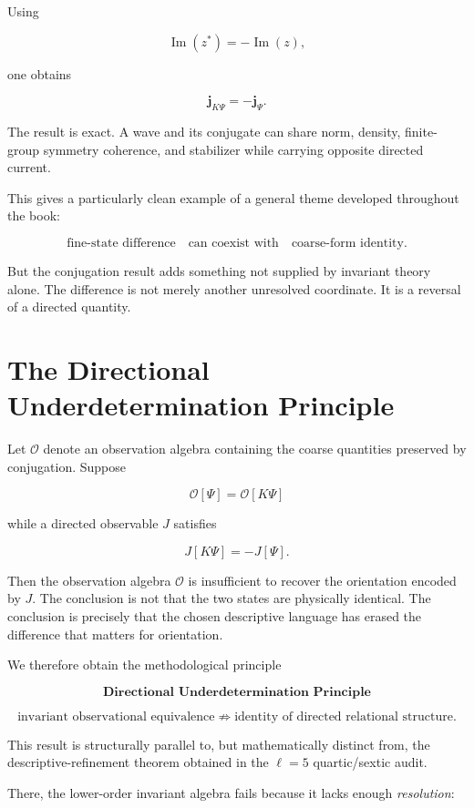 Using

\[
\operatorname{Im}(z^*)=-\operatorname{Im}(z),
\]

one obtains

\[
\boxed{
\mathbf j_{K\Psi}=-\mathbf j_{\Psi}.
}
\]

The result is exact. A wave and its conjugate can share norm, density, finite-group symmetry coherence, and stabilizer while carrying opposite directed current.

This gives a particularly clean example of a general theme developed throughout the book:

\[
\text{fine-state difference}
\quad\text{can coexist with}\quad
\text{coarse-form identity}.
\]

But the conjugation result adds something not supplied by invariant theory alone. The difference is not merely another unresolved coordinate. It is a reversal of a directed quantity.

\section{The Directional Underdetermination Principle}

Let $\mathcal O$ denote an observation algebra containing the coarse quantities preserved by conjugation. Suppose

\[
\mathcal O[\Psi]=\mathcal O[K\Psi]
\]

while a directed observable $J$ satisfies

\[
J[K\Psi]=-J[\Psi].
\]

Then the observation algebra $\mathcal O$ is insufficient to recover the orientation encoded by $J$. The conclusion is not that the two states are physically identical. The conclusion is precisely that the chosen descriptive language has erased the difference that matters for orientation.

We therefore obtain the methodological principle

\[
\boxed{
\textbf{Directional Underdetermination Principle}
}
\]

\[
\boxed{
\text{invariant observational equivalence}
\not\Rightarrow
\text{identity of directed relational structure}.
}
\]

This result is structurally parallel to, but mathematically distinct from, the descriptive-refinement theorem obtained in the $\ell=5$ quartic/sextic audit.

There, the lower-order invariant algebra fails because it lacks enough \emph{resolution}:

